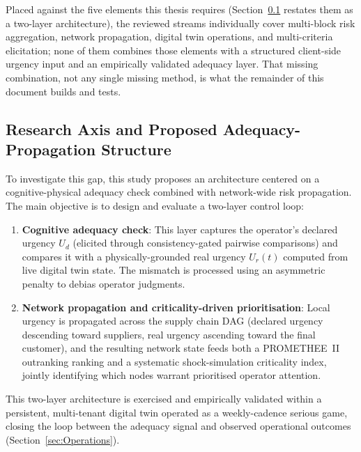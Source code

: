 Placed against the five elements this thesis requires (Section~\ref{subsec:contribution} restates them as a two-layer architecture), the reviewed streams individually cover multi-block risk aggregation, network propagation, digital twin operations, and multi-criteria elicitation; none of them combines those elements with a structured client-side urgency input and an empirically validated adequacy layer. That missing combination, not any single missing method, is what the remainder of this document builds and tests.

\subsection{Research Axis and Proposed Adequacy-Propagation Structure}
\label{subsec:contribution}

To investigate this gap, this study proposes an architecture centered on a cognitive-physical adequacy check combined with network-wide risk propagation. The main objective is to design and evaluate a two-layer control loop:
\begin{enumerate}
    \item \textbf{Cognitive adequacy check}: This layer captures the operator's declared urgency $U_d$ (elicited through consistency-gated pairwise comparisons) and compares it with a physically-grounded real urgency $U_r(t)$ computed from live digital twin state. The mismatch is processed using an asymmetric penalty to debias operator judgments.
    \item \textbf{Network propagation and criticality-driven prioritisation}: Local urgency is propagated across the supply chain DAG (declared urgency descending toward suppliers, real urgency ascending toward the final customer), and the resulting network state feeds both a PROMETHEE~II outranking ranking and a systematic shock-simulation criticality index, jointly identifying which nodes warrant prioritised operator attention.
\end{enumerate}

This two-layer architecture is exercised and empirically validated within a persistent, multi-tenant digital twin operated as a weekly-cadence serious game, closing the loop between the adequacy signal and observed operational outcomes (Section~\ref{sec:Operations}).
